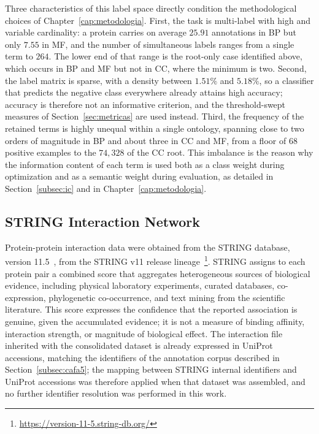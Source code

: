 \documentclass[Ingles]{ic-tese-v3}
\begin{document}
Three characteristics of this label space directly condition the methodological
choices of Chapter~\ref{cap:metodologia}. First, the task is multi-label with
high and variable cardinality: a protein carries on average $25.91$ annotations
in BP but only $7.55$ in MF, and the number of simultaneous labels ranges from a
single term to $264$. The lower end of that range is the root-only case
identified above, which occurs in BP and MF but not in CC, where the minimum is
two. Second, the label matrix is sparse, with a density between $1.51\%$ and
$5.18\%$, so a classifier that predicts the negative class everywhere already
attains high accuracy; accuracy is therefore not an informative criterion, and
the threshold-swept measures of Section~\ref{sec:metricas} are used instead.
Third, the frequency of the retained terms is highly unequal within a single
ontology, spanning close to two orders of magnitude in BP and about three in CC
and MF, from a floor of $68$ positive examples to the $74{,}328$ of the CC root.
This imbalance is the reason why the information content of each term is used
both as a class weight during optimization and as a semantic weight during
evaluation, as detailed in Section~\ref{subsec:ic} and in
Chapter~\ref{cap:metodologia}.

\subsection{STRING Interaction Network}
\label{subsec:string}

Protein-protein interaction data were obtained from the STRING database, version
11.5~\cite{szklarczyk_string_2021}, from the STRING v11 release lineage~\cite{szklarczyk2019string}\footnote{\url{https://version-11-5.string-db.org/}}. STRING assigns to each protein pair a
combined score that aggregates heterogeneous sources of biological evidence,
including physical laboratory experiments, curated databases, co-expression,
phylogenetic co-occurrence, and text mining from the scientific literature. This
score expresses the confidence that the reported association is genuine, given
the accumulated evidence; it is not a measure of binding affinity, interaction
strength, or magnitude of biological effect. The interaction file inherited with
the consolidated dataset is already expressed in UniProt accessions, matching the
identifiers of the annotation corpus described in Section~\ref{subsec:cafa5}; the
mapping between STRING internal identifiers and UniProt accessions was therefore
applied when that dataset was assembled, and no further identifier resolution was
performed in this work.
\end{document}
